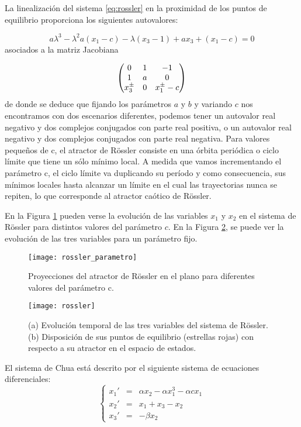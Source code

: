 La linealización del sistema \ref{eq:rossler} en la proximidad de los puntos de equilibrio proporciona los siguientes autovalores:

\begin{equation}
a \lambda^3 - \lambda^2 a (x_1-c)-\lambda(x_3-1)+ax_3+(x_1-c)=0 \nonumber
\end{equation}
 asociados a la matriz Jacobiana
 
\begin{equation}
\begin{pmatrix}
0 &\-1 &-1 \\
1 &a &0 \\
x_3^\pm &0 &x_1^\pm-c
\end{pmatrix}
\nonumber
\end{equation}
de donde se deduce que fijando los parámetros $a$ y $b$ y variando $c$ nos encontramos con dos escenarios diferentes, podemos tener un autovalor real negativo y dos complejos conjugados con parte real positiva, o un autovalor real negativo y dos complejos conjugados con parte real negativa.
Para valores pequeños de c, el atractor de Rössler consiste en una órbita periódica o ciclo límite que tiene un sólo mínimo local.
A medida que vamos incrementando el parámetro c, el ciclo límite va duplicando su período y como consecuencia, sus mínimos locales hasta alcanzar un límite en el cual las trayectorias nunca se repiten, lo que corresponde al atractor caótico de Rössler. 

En la Figura \ref{fig:rossler_parametro} pueden verse la evolución de las variables $x_1$ y $x_2$ en el sistema de Rössler para distintos valores del parámetro $c$.
En la Figura \ref{fig:rossler}, se puede ver la evolución de las tres variables para un parámetro fijo.
%
\begin{figure}
\centering\texttt{[image: rossler\_parametro]}
\caption{Proyecciones del atractor de Rössler en el plano  para diferentes valores del parámetro c.}
\label{fig:rossler_parametro}
\end{figure}
%
\begin{figure}
\centering\texttt{[image: rossler]}
\caption{(a) Evolución temporal de las tres variables del sistema de Rössler. (b) Disposición de sus puntos de equilibrio (estrellas rojas) con respecto a su atractor en el espacio de estados.}
\label{fig:rossler}
\end{figure}

El sistema de Chua está descrito por el siguiente sistema de ecuaciones diferenciales:
\begin{equation}\label{eq:chua}
\left \{
\begin{array}{rcl}
x_1' &=& \alpha x_2- \alpha x_1^3- \alpha c x_1\\
x_2' &=& x_1 + x_3 - x_2\\
x_3' &=& -\beta x_2
\end{array}
\right.
\end{equation}

